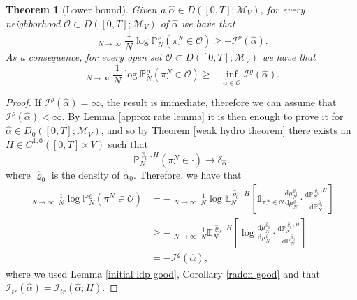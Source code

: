 \documentclass[11pt]{article}
\numberwithin{equation}{section}
\DeclareMathOperator*\lowlim{\underline{lim}}
\theoremstyle{definition}
\theoremstyle{plain}
\newtheorem{Theorem}{Theorem}[section]
\newcommand{\E}{\mathbb{E}}
\newcommand{\p}{\mathbb{P}}
\newcommand{\dd}{\mathrm{d}}
\newcommand{\nn}{\nonumber}
\begin{document}
\begin{Theorem}[Lower bound]\label{low bound neigh}
    Given a $\widehat{\alpha} \in D([0,T];\mathcal{M}_V)$, for every neighborhood $\mathcal{O} \subset D([0,T];\mathcal{M}_V)$ of $\widehat{\alpha}$ we have that 
        \begin{equation}
            \lowlim_{N\to\infty} \frac{1}{N} \log \mathbb{P}_N^{\varrho}(\pi^N_{\cdot} \in \mathcal{O}) \geq - \mathcal{I}^{\varrho}(\widehat{\alpha}).
        \end{equation}
    As a consequence, for every open set $\mathcal{O} \subset  D([0,T];\mathcal{M}_V)$ we have that 
        \begin{equation}
            \lowlim_{N\to\infty} \frac{1}{N} \log \mathbb{P}_N^{\varrho}(\pi^N_{\cdot} \in \mathcal{O}) \geq -\inf_{\widehat{\alpha} \in \mathcal{O}} \mathcal{I}^{\varrho}(\widehat{\alpha}).
        \end{equation}
\end{Theorem}
\begin{proof}
    If $\mathcal{I}^{\varrho}(\widehat{\alpha})=\infty$, the result is immediate, therefore we can assume that $\mathcal{I}^{\varrho}(\widehat{\alpha})<\infty$. By Lemma \ref{approx rate lemma} it is then enough to prove it for $\widehat{\alpha} \in D_0([0,T];\mathcal{M}_V)$, and so by Theorem \ref{weak hydro theorem} there exists an $H\in C^{1,0}([0,T]\times V)$ such that 
        \begin{equation}
            \p^{\widehat{\varrho}_0,H}_N(\pi^N_{\cdot} \in \cdot) \to \delta_{\widehat{\alpha}}.
        \end{equation}
    where $\widehat{\varrho}_0$ is the density of $\widehat{\alpha}_0$. Therefore, we have that 
        \begin{align}
            \lowlim_{N\to\infty} \frac{1}{N} \log \mathbb{P}_N^{\varrho}(\pi^N_{\cdot} \in \mathcal{O})
            &\nn= - \lowlim_{N\to\infty}\frac{1}{N}\log \E^{\widehat{\varrho}_0, H}_N\left[\mathds{1}_{\pi^N_{\cdot} \in \mathcal{O}} \frac{\dd \mu^{\widehat{\varrho}_0}_N}{\dd \mu^{\varrho}_N}\cdot\frac{\dd \p^{\widehat{\varrho}_0,H}_N}{\dd \p^{\widehat{\varrho}_0}_N} \right]\\
            \nn&\geq - \lowlim_{N\to\infty}\frac{1}{N}\E^{\widehat{\varrho}_0,H}_N\left[\log \frac{\dd \mu^{\widehat{\varrho}_0}_N}{\dd \mu^{\varrho}_N}\cdot\frac{\dd \p^{\widehat{\varrho}_0,H}_N}{\dd \p^{\widehat{\varrho}_0}_N} \right]\\
            &= - \mathcal{I}^{\varrho} (\widehat{\alpha}),
        \end{align}
    where we used Lemma \ref{initial ldp good}, Corollary \ref{radon good} and  that $\mathcal{I}_{tr}(\widehat{\alpha}) = \mathcal{I}_{tr}(\widehat{\alpha};H)$.
\end{proof}
\end{document}

